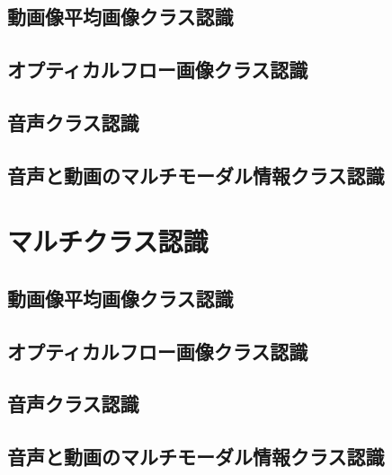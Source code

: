 \subsection{動画像平均画像クラス認識}
\subsection{オプティカルフロー画像クラス認識}
\subsection{音声クラス認識}
\subsection{音声と動画のマルチモーダル情報クラス認識}


\section{マルチクラス認識}
\subsection{動画像平均画像クラス認識}
\subsection{オプティカルフロー画像クラス認識}
\subsection{音声クラス認識}
\subsection{音声と動画のマルチモーダル情報クラス認識}

